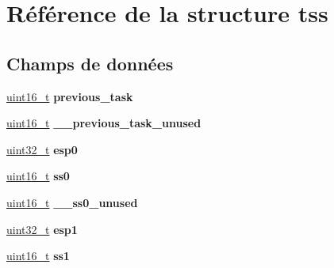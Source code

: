\hypertarget{structtss}{\section{Référence de la structure tss}
\label{structtss}
}
\subsection*{Champs de données}
\begin{DoxyCompactItemize}
\item 
\hypertarget{structtss_ad53ac7d2e96d874b937cd8ba2ec99b68}{\hyperlink{kernel_2include_2types_8h_adf4d876453337156dde61095e1f20223}{uint16\-\_\-t} {\bfseries previous\-\_\-task}}\label{structtss_ad53ac7d2e96d874b937cd8ba2ec99b68}

\item 
\hypertarget{structtss_aa9c707a0e579d5c4aa5cdc6a74dc52f0}{\hyperlink{kernel_2include_2types_8h_adf4d876453337156dde61095e1f20223}{uint16\-\_\-t} {\bfseries \-\_\-\-\_\-previous\-\_\-task\-\_\-unused}}\label{structtss_aa9c707a0e579d5c4aa5cdc6a74dc52f0}

\item 
\hypertarget{structtss_a7e43a5ebd87f7dc5b342942daf46b6f1}{\hyperlink{kernel_2include_2types_8h_a33594304e786b158f3fb30289278f5af}{uint32\-\_\-t} {\bfseries esp0}}\label{structtss_a7e43a5ebd87f7dc5b342942daf46b6f1}

\item 
\hypertarget{structtss_a21766cd40c3c8f0036091d76956edc6c}{\hyperlink{kernel_2include_2types_8h_adf4d876453337156dde61095e1f20223}{uint16\-\_\-t} {\bfseries ss0}}\label{structtss_a21766cd40c3c8f0036091d76956edc6c}

\item 
\hypertarget{structtss_ae0b947bcd701d61513f54ae0fe5d8e67}{\hyperlink{kernel_2include_2types_8h_adf4d876453337156dde61095e1f20223}{uint16\-\_\-t} {\bfseries \-\_\-\-\_\-ss0\-\_\-unused}}\label{structtss_ae0b947bcd701d61513f54ae0fe5d8e67}

\item 
\hypertarget{structtss_ab2b4ce638811e1a254005e069886f8b3}{\hyperlink{kernel_2include_2types_8h_a33594304e786b158f3fb30289278f5af}{uint32\-\_\-t} {\bfseries esp1}}\label{structtss_ab2b4ce638811e1a254005e069886f8b3}

\item 
\hypertarget{structtss_aa527f4b4f275061d8750f527c7ab6fcf}{\hyperlink{kernel_2include_2types_8h_adf4d876453337156dde61095e1f20223}{uint16\-\_\-t} {\bfseries ss1}}\label{structtss_aa527f4b4f275061d8750f527c7ab6fcf}


\end{DoxyCompactItemize}
